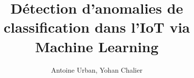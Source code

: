 \documentclass{beamer}
\title{Détection d'anomalies de classification dans l'IoT via Machine Learning}
\author{Antoine Urban, Yohan Chalier}
\institute{Projet de filière SR2I \\ Télécom ParisTech}
\begin{document}
\begin{frame}
\titlepage
\end{frame}
\end{document}

